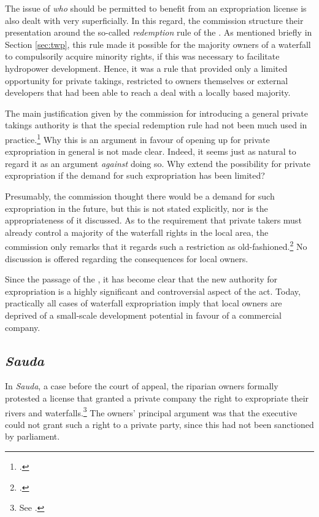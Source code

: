 The issue of {\it who} should be permitted to benefit from an expropriation license is also dealt with very superficially. In this regard, the commission structure their presentation around the so-called {\it redemption} rule of the \cite{wra40}. As mentioned briefly in Section \ref{sec:twp}, this rule made it possible for the majority owners of a waterfall to compulsorily acquire minority rights, if this was necessary to facilitate hydropower development. Hence, it was a rule that provided only a limited opportunity for private takings, restricted to owners themselves or external developers that had been able to reach a deal with a locally based majority.

The main justification given by the commission for introducing a general private takings authority is that the special redemption rule had not been much used in practice.\footcite[236]{nou94} Why this is an argument in favour of opening up for private expropriation in general is not made clear. Indeed, it seems just as natural to regard it as an argument {\it against} doing so. Why extend the possibility for private expropriation if the demand for such expropriation has been limited? 

Presumably, the commission thought there would be a demand for such expropriation in the future, but this is not stated explicitly, nor is the appropriateness of it discussed. As to the requirement that private takers must already control a majority of the waterfall rights in the local area, the commission only remarks that it regards such a restriction as old-fashioned.\footcite[236]{nou94} No discussion is offered regarding the consequences for local owners.

Since the passage of the \cite{wra00}, it has become clear that the new authority for expropriation is a highly significant and controversial aspect of the act. Today, practically all cases of waterfall expropriation imply that local owners are deprived of a small-scale development potential in favour of a commercial company.

\subsection{\it Sauda}

In {\it Sauda}, a case before the court of appeal,  the riparian owners formally protested a license that granted a private company the right to expropriate their rivers and waterfalls.\footnote{See \cite{sauda09}.} The owners' principal argument was that the executive could not grant such a right to a private party, since this had not been sanctioned by parliament. 

